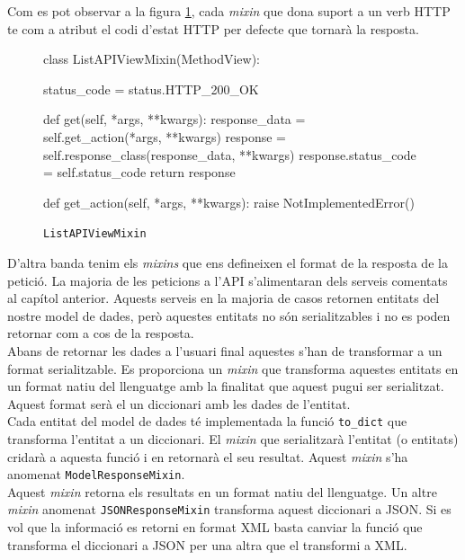 Com es pot observar a la figura \ref{fig:mixin}, cada \emph{mixin} que dona suport a un verb \ac{HTTP} te com a atribut el codi d'estat \ac{HTTP} per defecte que tornarà la resposta. \\

\begin{figure}[h!]
	\begin{python}
class ListAPIViewMixin(MethodView):

	status_code = status.HTTP_200_OK
	
	def get(self, *args, **kwargs):
		response_data = self.get_action(*args, **kwargs)
		response = self.response_class(response_data, **kwargs)
		response.status_code = self.status_code
		return response
		
	def get_action(self, *args, **kwargs):
		raise NotImplementedError()
	\end{python}
	\caption{\texttt{ListAPIViewMixin}}
	\label{fig:mixin}
\end{figure}

D'altra banda tenim els \emph{mixins} que ens defineixen el format de la resposta de la petició. La majoria de les peticions a l'\ac{API} s'alimentaran dels serveis comentats al capítol anterior. Aquests serveis en la majoria de casos retornen entitats del nostre model de dades, però aquestes entitats no són serialitzables i no es poden retornar com a cos de la resposta. \\

Abans de retornar les dades a l'usuari final aquestes s'han de transformar a un format serialitzable. Es proporciona un \emph{mixin} que transforma aquestes entitats en un format natiu del llenguatge amb la finalitat que aquest pugui ser serialitzat. Aquest format serà el un diccionari amb les dades de l'entitat.\\

Cada entitat del model de dades té implementada la funció \texttt{to\_dict} que transforma l'entitat a un diccionari. El \emph{mixin} que serialitzarà l'entitat (o entitats) cridarà a aquesta funció i en retornarà el seu resultat. Aquest \emph{mixin} s'ha anomenat \texttt{ModelResponseMixin}.\\

Aquest \emph{mixin} retorna els resultats en un format natiu del llenguatge. Un altre \emph{mixin} anomenat \texttt{JSONResponseMixin} transforma aquest diccionari a \ac{JSON}. Si es vol que la informació es retorni en format \ac{XML} basta canviar la funció que transforma el diccionari a \ac{JSON} per una altra que el transformi a \ac{XML}.\\

